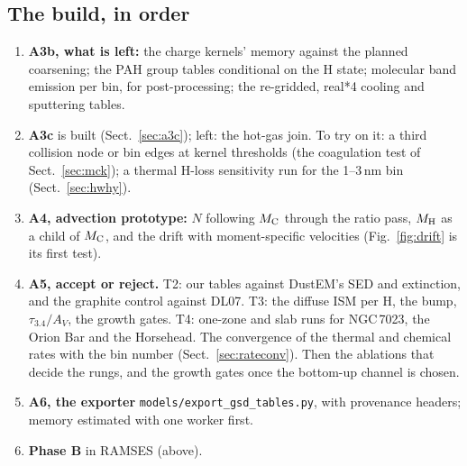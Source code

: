 \documentclass[11pt,a4paper]{article}
\newcommand{\MH}{M_{\rm H}}
\newcommand{\MC}{M_{\rm C}}
\begin{document}
\subsection{The build, in order}
\begin{enumerate}
\item \textbf{A3b, what is left:} the charge kernels' memory against the planned coarsening; the PAH group tables
  conditional on the H state; molecular band emission per bin, for post-processing; the re-gridded, real*4 cooling and
  sputtering tables.
\item \textbf{A3c} is built (Sect.~\ref{sec:a3c}); left: the hot-gas join. To try on it: a third collision node or
  bin edges at kernel thresholds (the coagulation test of Sect.~\ref{sec:mck}); a thermal H-loss sensitivity run for
  the 1--3\,nm bin (Sect.~\ref{sec:hwhy}).
\item \textbf{A4, advection prototype:} $N$ following $\MC$ through the ratio pass, $\MH$ as a child of $\MC$, and
  the drift with moment-specific velocities (Fig.~\ref{fig:drift} is its first test).
\item \textbf{A5, accept or reject.} T2: our tables against DustEM's SED and extinction, and the graphite control
  against DL07. T3: the diffuse ISM per H, the bump, $\tau_{3.4}/A_V$, the growth gates. T4: one-zone and slab runs for
  NGC\,7023, the Orion Bar and the Horsehead. The convergence of the thermal and chemical rates with the bin number
  (Sect.~\ref{sec:rateconv}). Then the ablations that decide the rungs, and the growth gates once the bottom-up
  channel is chosen.
\item \textbf{A6, the exporter} \texttt{models/export\_gsd\_tables.py}, with provenance headers; memory estimated with one
  worker first.
\item \textbf{Phase B} in RAMSES (above).
\end{enumerate}

\appendix
\end{document}
